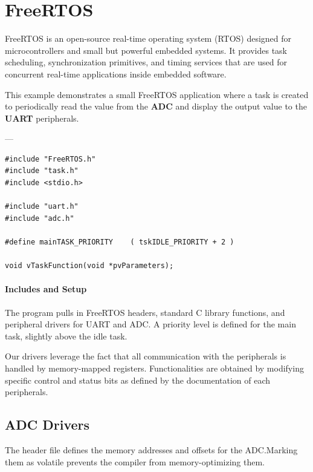 \documentclass{article}
\begin{document}
\section{FreeRTOS}  
FreeRTOS is an open-source real-time operating system (RTOS) designed for microcontrollers and small but powerful embedded systems.  
It provides task scheduling, synchronization primitives, and timing services that are used for concurrent real-time applications inside embedded software. 
\cite{freertos-book}


This example demonstrates a small FreeRTOS application where a task is created to periodically read the value from the \textbf{ADC} and display the output value to the \textbf{UART} peripherals.


---

\begin{verbatim}
#include "FreeRTOS.h"
#include "task.h"
#include <stdio.h>

#include "uart.h"
#include "adc.h"

#define mainTASK_PRIORITY    ( tskIDLE_PRIORITY + 2 )

void vTaskFunction(void *pvParameters);
\end{verbatim}

\paragraph{Includes and Setup}  
The program pulls in FreeRTOS headers, standard C library functions, and peripheral drivers for UART and ADC.  
A priority level is defined for the main task, slightly above the idle task.


Our drivers leverage the fact that all communication with the peripherals is handled by memory-mapped registers. Functionalities are obtained by modifying specific control and status bits as defined by the documentation of each peripherals.

\subsection{ADC Drivers}
The header file defines the memory addresses and offsets for the ADC.Marking them as volatile prevents the compiler from memory-optimizing them.
\end{document}
